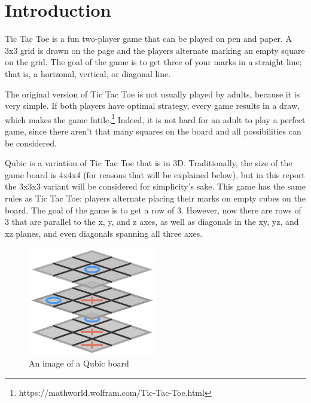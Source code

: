 \documentclass[11pt]{article}
\begin{document}

\section{Introduction}

Tic Tac Toe is a fun two-player game that can be played on pen and paper. A 3x3 grid is drawn on the page and the players alternate marking an empty square on the grid. The goal of the game is to get three of your marks in a straight line; that is, a horizonal, vertical, or diagonal line.

The original version of Tic Tac Toe is not usually played by adults, because it is very simple. If both players have optimal strategy, every game results in a draw, which makes the game futile.\footnote{https://mathworld.wolfram.com/Tic-Tac-Toe.html} Indeed, it is not hard for an adult to play a perfect game, since there aren't that many squares on the board and all possibilities can be considered.

Qubic is a variation of Tic Tac Toe that is in 3D. Traditionally, the size of the game board is 4x4x4 (for reasons that will be explained below), but in this report the 3x3x3 variant will be considered for simplicity's sake. This game has the same rules as Tic Tac Toe: players alternate placing their marks on empty cubes on the board. The goal of the game is to get a row of 3. However, now there are rows of 3 that are parallel to the x, y, and z axes, as well as diagonals in the xy, yz, and xz planes, and even diagonals spanning all three axes.

\begin{figure}[h]
    \centering
    \includegraphics[width=0.5\textwidth]{qubic}
    \caption[An image of a Qubic board]{An image of a Qubic board\footnotemark}
    \label{fig:qubic}
\end{figure}
\end{document}
